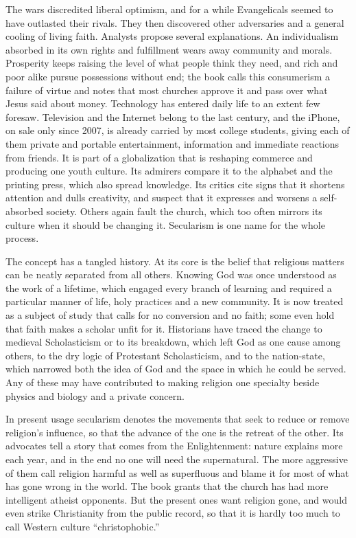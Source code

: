 The wars discredited liberal optimism, and for a while Evangelicals seemed to have outlasted their
rivals. They then discovered other adversaries and a general cooling of living faith. Analysts
propose several explanations. An individualism absorbed in its own rights and fulfillment wears away
community and morals. Prosperity keeps raising the level of what people think they need, and rich and
poor alike pursue possessions without end; the book calls this consumerism a failure of virtue and
notes that most churches approve it and pass over what Jesus said about money. Technology has entered
daily life to an extent few foresaw. Television and the Internet belong to the last century, and the
iPhone, on sale only since 2007, is already carried by most college students, giving each of them
private and portable entertainment, information and immediate reactions from friends. It is part of
a globalization that is reshaping commerce and producing one youth culture. Its admirers compare it
to the alphabet and the printing press, which also spread knowledge. Its critics cite signs that it
shortens attention and dulls creativity, and suspect that it expresses and worsens a self-absorbed
society. Others again fault the church, which too often mirrors its culture when it should be
changing it. Secularism is one name for the whole process.

The concept has a tangled history. At its core is the belief that religious matters can be neatly
separated from all others. Knowing God was once understood as the work of a lifetime, which engaged
every branch of learning and required a particular manner of life, holy practices and a new
community. It is now treated as a subject of study that calls for no conversion and no faith; some
even hold that faith makes a scholar unfit for it. Historians have traced the change to medieval
Scholasticism or to its breakdown, which left God as one cause among others, to the dry logic of
Protestant Scholasticism, and to the nation-state, which narrowed both the idea of God and the space
in which he could be served. Any of these may have contributed to making religion one specialty
beside physics and biology and a private concern.

In present usage secularism denotes the movements that seek to reduce or remove religion's
influence, so that the advance of the one is the retreat of the other. Its advocates tell a story
that comes from the Enlightenment: nature explains more each year, and in the end no one will need
the supernatural. The more aggressive of them call religion harmful as well as superfluous and blame
it for most of what has gone wrong in the world. The book grants that the church has had more
intelligent atheist opponents. But the present ones want religion gone, and would even strike
Christianity from the public record, so that it is hardly too much to call Western culture
``christophobic.''

